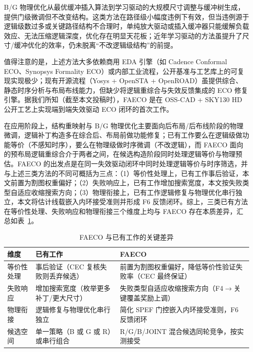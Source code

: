 \documentclass[journal]{IEEEtran}
\begin{document}
B/G 物理优化从最优缓冲插入算法\cite{liang2012buffer}到学习驱动的大规模尺寸调整与缓冲树生成\cite{liu2021rlsizer,huang2025phys,chen2024aito,zhang2025buffalo}，提供门级微调但不改变结构。这类方法在路径级小幅度违例下有效，但当违例源于逻辑级数过多或关键路径结构不合理时，单纯放大驱动或插入缓冲器只能缓解负载效应、无法压缩逻辑深度，优化存在明显天花板\cite{liu2021rlsizer,huang2025phys}；近年学习驱动的方法\cite{chen2024aito,zhang2025buffalo}虽提升了尺寸/缓冲优化的效率，仍未脱离“不改逻辑级结构”的前提。

值得注意的是，上述方法大多依赖商用 EDA 引擎（如 Cadence Conformal ECO、Synopsys Formality ECO）或内部工业流程，公开基准与工艺库上的可复现实现极少；现有开源流程（Yosys + OpenSTA + OpenROAD）虽提供综合、静态时序分析与布局布线能力，但缺少将逻辑重综合与失效反馈集成的 ECO 修复引擎。据我们所知（截至本文投稿时），FAECO 是在 OSS-CAD + SKY130 HD 公开工艺上实现端到端失效驱动 ECO 闭环的首次工作。

在应用阶段上，结构重映射与 B/G 物理优化主要面向后布局/后布线阶段的物理微调，逻辑补丁构造多在综合后、布局前做功能修复；已有工作要么在逻辑级做功能等价（不感知时序），要么在物理级做时序微调（不改逻辑），而 FAECO 面向的预布局逻辑重综合介于两者之间，在候选构造阶段同时处理逻辑等价与物理预估。FAECO 的出发点是在同一失效驱动闭环中同时处理逻辑等价与时序筛选，并与上述三类方法的不同可概括为三点：（1）等价性处理上，已有工作事后验证，本文前置为割图权重偏好；（2）失败响应上，已有工作增加搜索宽度，本文按失败类型自适应收缩搜索方向；（3）物理衔接上，已有工作逻辑修复与物理优化串行独立，本文将估计线载嵌入内环接受准则并形成 F6 反馈闭环。综上，三类已有方法在等价性处理、失败响应和物理衔接三个维度上均与 FAECO 存在本质差异，汇总如表~\ref{tab:related_diff}。

\begin{table}[!t]
\centering
\caption{FAECO 与已有工作的关键差异}
\label{tab:related_diff}
\footnotesize
\setlength{\tabcolsep}{3pt}
\begin{tabular}{p{2.2cm}p{2.8cm}p{3.2cm}}
\toprule
\textbf{维度} & \textbf{已有工作} & \textbf{FAECO} \\
\midrule
等价性处理 & 事后验证（CEC 复核失败则丢弃候选） & 前置为割图权重偏好，降低等价性验证失败率（CEC 最终保证） \\
失败响应 & 增加搜索宽度（枚举更多补丁/更大尺寸） & 失败类型自适应收缩搜索方向（F4$\to$关键覆盖奖励上调） \\
物理衔接 & 逻辑修复与物理优化串行独立 & 简化 SPEF 门控嵌入内环接受准则，F6 反馈闭环 \\
候选空间 & 单一策略（B 或 G 或 R）或串行组合 & R/G/B/JOINT 混合候选同轮竞争，按实测接受 \\
\bottomrule
\end{tabular}
\end{table}
\end{document}
